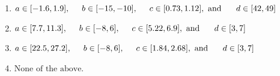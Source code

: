 \documentclass[14pt]{extbook}
\begin{document}
\begin{enumerate}
{\begin{enumerate}[label=\Alph*.]
\item \( a \in [-1.6, 1.9], \hspace*{5mm} b \in [-15, -10], \hspace*{5mm} c \in [0.73, 1.12], \text{ and } \hspace*{5mm} d \in [42, 49] \)
\item \( a \in [7.7, 11.3], \hspace*{5mm} b \in [-8, 6], \hspace*{5mm} c \in [5.22, 6.9], \text{ and } \hspace*{5mm} d \in [3, 7] \)
\item \( a \in [22.5, 27.2], \hspace*{5mm} b \in [-8, 6], \hspace*{5mm} c \in [1.84, 2.68], \text{ and } \hspace*{5mm} d \in [3, 7] \)
\item \( \text{None of the above.} \)

\end{enumerate} }
\end{enumerate}
\end{document}
